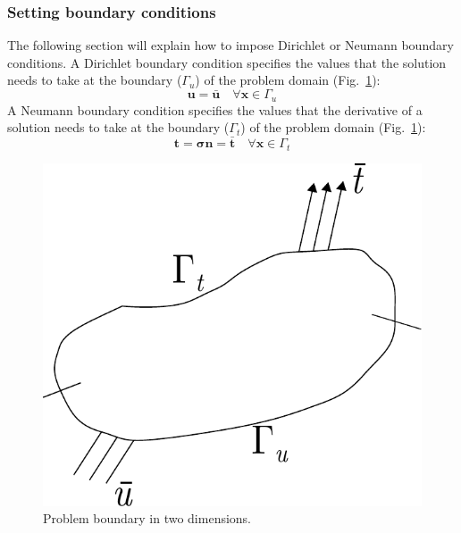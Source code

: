 \documentclass[a4paper,11pt]{book}
\renewcommand{\vec}[1]{\ensuremath{\boldsymbol{#1}}}
\newcommand{\mat}[1]{\ensuremath{\boldsymbol{#1}}}
\begin{document}
\subsubsection{Setting boundary conditions\label{sect:smm:boundary}}
The following section will explain how to impose Dirichlet or Neumann boundary conditions. A Dirichlet boundary condition specifies the values that the solution needs to take at the boundary ($\Gamma_u$) of the problem domain (Fig.~\ref{fig:smm:boundaries}):
\begin{equation}
  \vec{u} = \vec{\bar u} \quad \forall \vec{x}\in \Gamma_{u}
\end{equation}
A Neumann boundary condition specifies the values that the derivative of a solution needs to take at the boundary ($\Gamma_t$) of the problem domain (Fig.~\ref{fig:smm:boundaries}):
\begin{equation}
  \vec{t} = \mat{\sigma} \vec{n} = \vec{\bar t} \quad \forall \vec{x}\in \Gamma_{t}
\end{equation} 
\begin{figure}[!htb]
  \centering
  \includegraphics[scale=0.6]{figures/boundary}
  \caption{Problem boundary in two dimensions.\label{fig:smm:boundaries}}
\end{figure}
\end{document}
